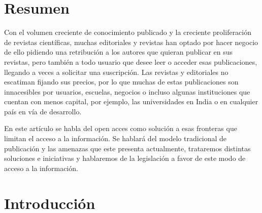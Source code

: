 \section*{Resumen}
Con el volumen creciente de conocimiento publicado y la creciente proliferación de revistas científicas, muchas editoriales y revistas han optado por hacer negocio de ello pidiendo una retribución a los autores que quieran publicar en sus revistas, pero también a todo usuario que desee leer o acceder esas publicaciones, llegando a veces a solicitar una suscripción. Las revistas y editoriales no escatiman fijando sus precios, por lo que muchas de estas publicaciones son innacesibles por usuarios, escuelas, negocios o incluso algunas instituciones que cuentan con menos capital, por ejemplo, las universidades en India o en cualquier país en vía de desarrollo.     

En este artículo se habla del open acces como solución a esas fronteras que limitan el acceso a la información. Se hablará del modelo tradicional de publicación y las amenazas que este presenta actualmente, trataremos distintas soluciones e iniciativas y hablaremos de la legislación a favor de este modo de acceso a la información.
 
\section{Introducción}

